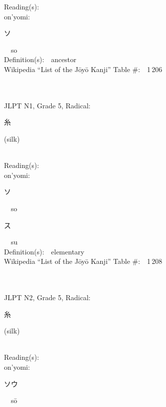 \begin{multicols}{2}
Reading(s):\ \ \\
{\hspace*{1em}}on'yomi:\ \ \\
{\hspace*{2em}}{\begin{CJK}{UTF8}{min} ソ \end{CJK}}\ \ so\ \ \\
Definition(s):\ \ ancestor \\
Wikipedia ``List of the J\=oy\=o Kanji'' Table \#:\ \ 1\,206 \\
\ \ \\
{\fontsize{34pt}{40pt}  }\ \ \\  %
{JLPT N1, Grade 5, Radical:\ \ {\begin{CJK}{UTF8}{min} 糸 \end{CJK}} (silk) } \\
Reading(s):\ \ \\
{\hspace*{1em}}on'yomi:\ \ \\
{\hspace*{2em}}{\begin{CJK}{UTF8}{min} ソ \end{CJK}}\ \ so\ \ \\
{\hspace*{2em}}{\begin{CJK}{UTF8}{min} ス \end{CJK}}\ \ su\ \ \\
Definition(s):\ \ elementary \\
Wikipedia ``List of the J\=oy\=o Kanji'' Table \#:\ \ 1\,208 \\
\ \ \\
{\fontsize{34pt}{40pt}  }\ \ \\  %
{JLPT N2, Grade 5, Radical:\ \ {\begin{CJK}{UTF8}{min} 糸 \end{CJK}} (silk) } \\
Reading(s):\ \ \\
{\hspace*{1em}}on'yomi:\ \ \\
{\hspace*{2em}}{\begin{CJK}{UTF8}{min} ソウ \end{CJK}}\ \ s\=o\ \ \\

\end{multicols}
